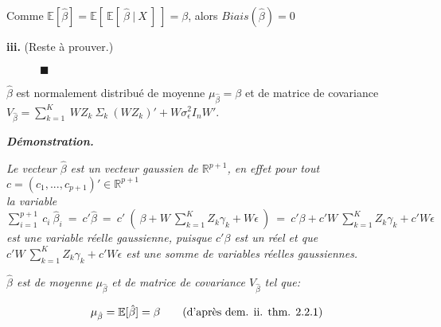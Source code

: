 \documentclass[12pt,fleqn]{book} %
\begin{document}
\vspace{0.5em}

Comme \:$\mathbb{E}[\hat{\beta}]=\mathbb{E}[\:\mathbb{E}[\:\hat{\beta}\:|\:X \:]\:]=\beta$,\: alors $Biais(\hat{\beta})=0$\\

\vspace{0.5em}


\textbf{iii.} (Reste à prouver.)


\vspace{1em}

$\quad\quad\quad \blacksquare$

\newpage

\begin{proposition}

$\hat{\beta}$ est normalement distribué de moyenne  $\mu_{\hat{\beta}}=\beta$ et de matrice de covariance $V_{\hat{\beta}}=\sum_{k=1}^{K}\: W Z_k\: \Sigma_k \:(W Z_k)'+ W\sigma_{\epsilon}^2 I_n W'$.

\end{proposition}

\vspace{0.5em}

\textit{\textbf{Démonstration.}}

\vspace{0.5em}

\textit{Le vecteur $\hat{\beta}$ est un vecteur gaussien de $\mathbb{R}^{p+1}$, en effet pour tout $c=(c_1, ... ,c_{p+1})'\in \mathbb{R}^{p+1}$\\ 
la variable\: $\sum_{i=1}^{p+1}\:c_i\:\hat{\beta}_i\:=\:c'\hat{\beta}\:=\:c'\:\left(\: \beta + W \:\sum_{k=1}^{K} Z_k \gamma_k +W\epsilon\:\right)\:=\:c'\beta+c'  W \:\sum_{k=1}^{K} Z_k \gamma_k+c'W\epsilon $\\ 
est une variable réelle gaussienne, puisque $c'\beta$ est un réel et que $c' W \:\sum_{k=1}^{K} Z_k \gamma_k+c'W\epsilon $ est une somme de variables réelles gaussiennes.}
   
\vspace{1em}

\textit{$\hat{\beta}$ est de moyenne $\mu_{\hat{\beta}}$ et de matrice de covariance $V_{\hat{\beta}}$ tel que:}

\begin{align*}
\mu_{\hat{\beta}}=\mathbb{E}[\hat{\beta}]=\beta \qquad\textnormal{(d'après dem. ii. thm. 2.2.1)}
\end{align*}
\end{document}
